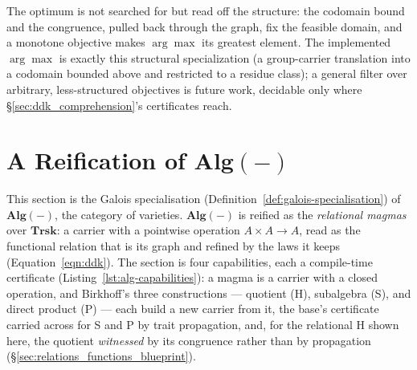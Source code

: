 \documentclass[11pt, a4paper]{article}
\begin{document}
The optimum is not searched for but read off the structure: the codomain bound and the congruence, pulled back through the graph, fix the feasible domain, and a monotone objective makes $\arg\max$ its greatest element.
The implemented $\arg\max$ is exactly this structural specialization (a group-carrier translation into a codomain bounded above and restricted to a residue class); a general filter over arbitrary, less-structured objectives is future work, decidable only where §\ref{sec:ddk_comprehension}'s certificates reach.

\section{A Reification of $\mathbf{Alg}(-)$}
\label{sec:algebraic_lattice_carriers}

This section is the Galois specialisation (Definition~\ref{def:galois-specialisation}) of $\mathbf{Alg}(-)$, the category of varieties.
$\mathbf{Alg}(-)$ is reified as the \emph{relational magmas} over $\mathbf{Trsk}$: a carrier with a pointwise operation $A \times A \to A$, read as the functional relation that is its graph and refined by the laws it keeps (Equation~\ref{eqn:ddk}).
The section is four capabilities, each a compile-time certificate (Listing~\ref{lst:alg-capabilities}): a magma is a carrier with a closed operation, and Birkhoff's three constructions --- quotient (H), subalgebra (S), and direct product (P) --- each build a new carrier from it, the base's certificate carried across for S and P by trait propagation, and, for the relational H shown here, the quotient \emph{witnessed} by its congruence rather than by propagation (\S\ref{sec:relations_functions_blueprint}).
\end{document}
